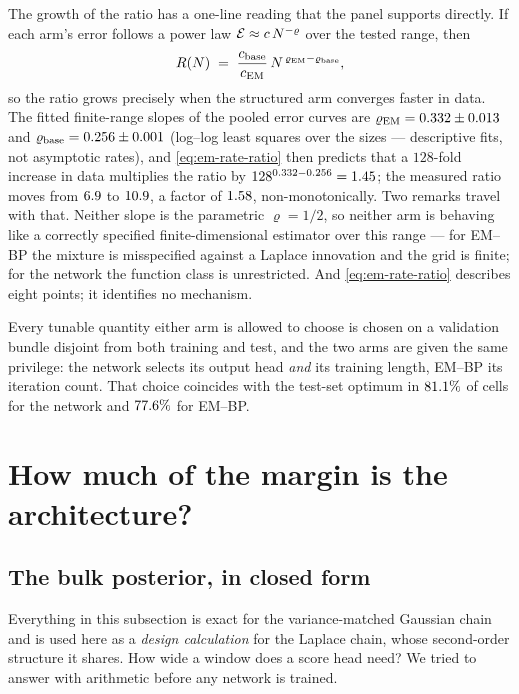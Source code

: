 The growth of the ratio has a one-line reading that the panel supports directly.
If each arm's error follows a power law $\mathcal{E} \approx c\,N^{-\varrho}$
over the tested range, then
\begin{equation}
  R(N) \;=\; \frac{c_{\mathrm{base}}}{c_{\mathrm{EM}}}\,
  N^{\,\varrho_{\mathrm{EM}} - \varrho_{\mathrm{base}}},
  \label{eq:em-rate-ratio}
\end{equation}
so the ratio grows precisely when the structured arm converges faster in data.
The fitted finite-range slopes of the pooled error curves are
$\varrho_{\mathrm{EM}} = 0.332 \pm 0.013$ and
$\varrho_{\mathrm{base}} = 0.256 \pm 0.001$
(log--log least squares over the
\nsizesused{} sizes --- descriptive fits, not asymptotic rates), and
\eqref{eq:em-rate-ratio} then predicts
that a $128$-fold increase in data multiplies the ratio by
$128^{0.332 - 0.256} = 1.45$; the measured ratio moves from
$6.9$ to $10.9$, a factor of $1.58$,
non-monotonically. Two remarks travel with that. Neither slope is the parametric
$\varrho = 1/2$, so neither arm is behaving like a correctly specified
finite-dimensional estimator over this range --- for EM--BP the mixture is
misspecified against a Laplace innovation and the grid is finite; for the
network the function class is unrestricted. And \eqref{eq:em-rate-ratio}
describes eight points; it identifies no mechanism.

Every tunable quantity either arm is allowed to choose is chosen on a validation
bundle disjoint from both training and test, and the two arms are given the same
privilege: the network selects its output head \emph{and} its training length,
EM--BP its iteration count. That choice coincides with the test-set optimum in
$81.1\%$ of cells for the network and $77.6\%$ for EM--BP. 

\section{How much of the margin is the architecture?}\label{sec:em-architecture}

\subsection{The bulk posterior, in closed form}\label{sec:em-locality-prediction}

Everything in this subsection is exact for the variance-matched Gaussian chain
and is used here as a \emph{design calculation} for the Laplace chain, whose
second-order structure it shares. How wide a
window does a score head need? We tried to answer with arithmetic before any
network is trained.

